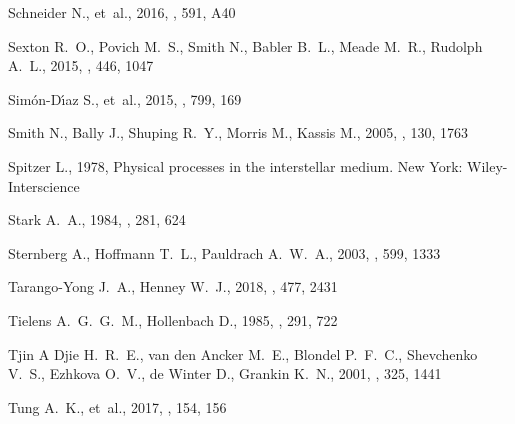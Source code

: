 \documentclass[useAMS, usenatbib, a4paper]{mnras}
\providecommand{\DIFaddtex}[1]{{\protect\color{red!70!black}\uwave{#1}}} %
\providecommand{\DIFaddbegin}{} %
\providecommand{\DIFaddend}{} %
\providecommand{\DIFadd}[1]{\texorpdfstring{\DIFaddtex{#1}}{#1}} %
\begin{document}
\begin{thebibliography}{}
{Schneider} N.,  et~al., 2016, \aap, 591, A40

{Sexton} R.~O.,  {Povich} M.~S.,  {Smith} N.,  {Babler} B.~L.,  {Meade} M.~R.,
   {Rudolph} A.~L.,  2015, \mnras, 446, 1047

{Simón-D{\'{\i}}az} S.,  et~al., 2015, \apj, 799, 169

{Smith} N.,  {Bally} J.,  {Shuping} R.~Y.,  {Morris} M.,   {Kassis} M.,  2005,
  \aj, 130, 1763

{Spitzer} L.,  1978, {Physical processes in the interstellar medium}.
New York: Wiley-Interscience

{Stark} A.~A.,  1984, \apj, 281, 624

{Sternberg} A.,  {Hoffmann} T.~L.,   {Pauldrach} A.~W.~A.,  2003, \apj, 599,
  1333

{Tarango-Yong} J.~A.,  {Henney} W.~J.,  2018, \mnras, 477, 2431 \DIFaddbegin \DIFadd{(Paper 0)
}\DIFaddend 

{Tielens} A.~G.~G.~M.,  {Hollenbach} D.,  1985, \apj, 291, 722

{Tjin A Djie} H.~R.~E.,  {van den Ancker} M.~E.,  {Blondel} P.~F.~C.,
  {Shevchenko} V.~S.,  {Ezhkova} O.~V.,  {de Winter} D.,   {Grankin} K.~N.,
  2001, \mnras, 325, 1441

{Tung} A.~K.,  et~al., 2017, \aj, 154, 156


\end{thebibliography}
\end{document}
